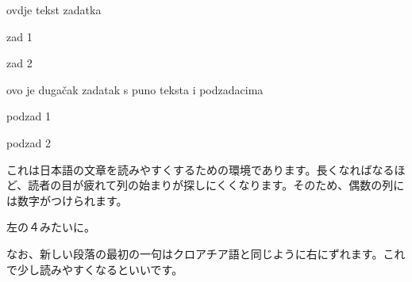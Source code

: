 

\author{Tomislav Mamić}	%


	
	
	\begin{mondai}{ovdje tekst zadatka}
		\item zad 1
		\item zad 2
		\item ovo je dugačak zadatak s puno teksta i podzadacima
		\vspace{-15pt} %
		\begin{mondai}{}
			\item podzad 1
			\item podzad 2
		\end{mondai}
	\end{mondai}
	\vspace{-30pt}
	\begin{bunshou}
		
		これは日本語の文章を読みやすくするための環境であります。長くなればなるほど、読者の目が疲れて列の始まりが探しにくくなります。そのため、偶数の列には数字がつけられます。
		
		左の４みたいに。
		
		なお、新しい段落の最初の一句はクロアチア語と同じように右にずれます。これで少し読みやすくなるといいです。
	\end{bunshou}
